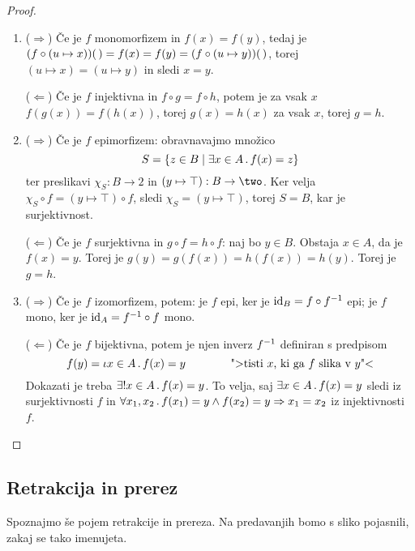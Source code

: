 \begin{proof}
  \begin{enumerate}
  \item ($\Rightarrow$) Če je $f$ monomorfizem in $f(x) = f(y)$, tedaj je
  $(f \circ (u \mapsto x)) \unit = f(x) = f(y) = (f \circ (u \mapsto y)) \unit$, torej
  $(u \mapsto x) = (u \mapsto y)$ in sledi $x = y$.

  ($\Leftarrow$) Če je $f$ injektivna in $f \circ g = f \circ h$, potem je za vsak $x$
  $f(g(x)) = f(h(x))$, torej $g(x) = h(x)$ za vsak $x$, torej $g = h$.

  \item
    ($\Rightarrow$) Če je $f$ epimorfizem: obravnavajmo množico
    \begin{equation*}
      S = \set{ z \in B \such \some{x \in A} f(x) = z }
    \end{equation*}
    ter preslikavi $\chi_S : B \to 2$ in $(y \mapsto \top) : B \to \two$. Ker velja
    $\chi_S \circ f = (y \mapsto \top) \circ f$, sledi $\chi_S = (y \mapsto \top)$, torej $S = B$, kar je surjektivnost.

    ($\Leftarrow$) Če je $f$ surjektivna in $g \circ f = h \circ f$: naj bo $y \in B$. Obstaja $x \in A$, da je $f(x) = y$. Torej je $g(y) = g(f(x)) = h(f(x)) = h(y)$.
    Torej je $g = h$.

  \item ($\Rightarrow$) Če je $f$ izomorfizem, potem:
    je $f$ epi, ker je $\id[B] = f \circ \inv{f}$ epi;
    je $f$ mono, ker je $\id[A] = \inv{f} \circ f$ mono.

    ($\Leftarrow$) Če je $f$ bijektivna, potem je njen inverz $\inv{f}$ definiran s predpisom
    \begin{equation*}
      f(y) = \descr{x \in A} f(x) = y \qquad\qquad
      \text{">tisti $x$, ki ga $f$ slika v $y$"<}
    \end{equation*}
    Dokazati je treba $\exactlyone{x \in A} f(x) = y$.
    To velja, saj $\some{x \in A} f(x) = y$ sledi iz surjektivnosti $f$ in
    $\all{x_1, x_2} f(x_1) = y \land f(x_2) = y \lthen x_1 = x_2$ iz injektivnosti~$f$.
  \end{enumerate}
\end{proof}

\subsection{Retrakcija in prerez}

Spoznajmo še pojem retrakcije in prereza. Na predavanjih bomo s sliko pojasnili, zakaj se tako imenujeta.

